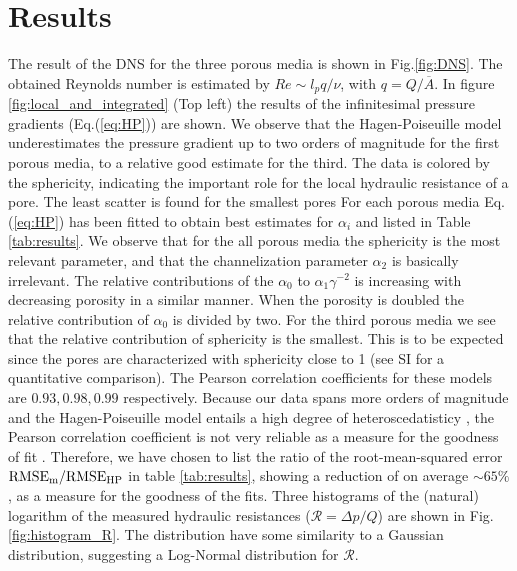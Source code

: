 \documentclass[draft]{agujournal2019}
\begin{document}
\section{Results}


The result of the DNS for the three porous media is shown in Fig.\ref{fig:DNS}. The obtained Reynolds number is estimated by $Re \sim l_p q/\nu$, with $q = Q/\overline{A}$. In figure \ref{fig:local_and_integrated} (Top left) the results of the infinitesimal pressure gradients (Eq.(\ref{eq:HP})) are shown. We observe that the Hagen-Poiseuille model underestimates the pressure gradient up to two orders of magnitude for the first porous media, to a relative good estimate for the third. The data is colored by the sphericity, indicating the important role for the local hydraulic resistance of a pore. The least scatter is found for the smallest pores For each porous media Eq.(\ref{eq:HP}) has been fitted to obtain best estimates for $\alpha_i$ and listed in Table \ref{tab:results}. We observe that for the all porous media the sphericity is the most relevant parameter, and that the channelization parameter $\alpha_2$ is basically irrelevant.  The relative contributions of the $\alpha_0$ to $\alpha_1\gamma^{-2}$ is increasing with decreasing porosity in a similar manner. When the porosity is doubled the relative contribution of $\alpha_0$ is divided by two. For the third porous media we see that the relative contribution of sphericity is the smallest. This is to be expected since the pores are characterized with sphericity close to 1 (see SI for a quantitative comparison). The Pearson correlation coefficients \citeA{}for these models are $0.93, 0.98, 0.99$ respectively. Because our data spans more orders of magnitude and the Hagen-Poiseuille model entails a high degree of heteroscedatisticy , the Pearson correlation coefficient is not very reliable as a measure for the goodness of fit . Therefore, we have chosen to list the ratio of the root-mean-squared error $\rm{RMSE}_m/\rm{RMSE}_{HP}$ in table \ref{tab:results}, showing a reduction of on average $\sim65\%$, as a measure for the goodness of the fits. Three histograms of the (natural) logarithm of the measured hydraulic resistances ($\mathcal{R}=\Delta p/Q$) are shown in Fig.\ref{fig:histogram_R}. The distribution have some similarity to a Gaussian distribution, suggesting a Log-Normal distribution for $\mathcal{R}$. 
\end{document}
